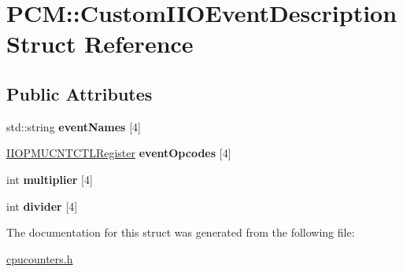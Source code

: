 \hypertarget{struct_p_c_m_1_1_custom_i_i_o_event_description}{}\section{P\+CM\+:\+:Custom\+I\+I\+O\+Event\+Description Struct Reference}
\label{struct_p_c_m_1_1_custom_i_i_o_event_description}
\subsection*{Public Attributes}
\begin{DoxyCompactItemize}
\item 
\mbox{\label{struct_p_c_m_1_1_custom_i_i_o_event_description_af615c81f40d39e8770822313cd5fdbb6}} 
std\+::string {\bfseries event\+Names} \mbox{[}4\mbox{]}
\item 
\mbox{\label{struct_p_c_m_1_1_custom_i_i_o_event_description_a6bb56f124b443dfb2a46b203488cb451}} 
\mbox{\hyperlink{struct_i_i_o_p_m_u_c_n_t_c_t_l_register}{I\+I\+O\+P\+M\+U\+C\+N\+T\+C\+T\+L\+Register}} {\bfseries event\+Opcodes} \mbox{[}4\mbox{]}
\item 
\mbox{\label{struct_p_c_m_1_1_custom_i_i_o_event_description_a7953c1b84fd3b592b1b703a646c48e21}} 
int {\bfseries multiplier} \mbox{[}4\mbox{]}
\item 
\mbox{\label{struct_p_c_m_1_1_custom_i_i_o_event_description_ae143fcdb7aa0f4c1cf5fb7f0767754e3}} 
int {\bfseries divider} \mbox{[}4\mbox{]}
\end{DoxyCompactItemize}


The documentation for this struct was generated from the following file\+:\begin{DoxyCompactItemize}
\item 
\mbox{\hyperlink{cpucounters_8h}{cpucounters.\+h}}\end{DoxyCompactItemize}
